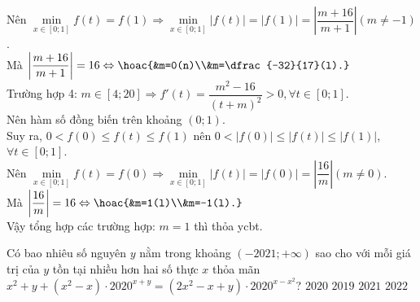\begin{ex}
{		Nên $\min\limits_{x\in[0;1]} f(t)=f(1)\Rightarrow\min\limits_{x\in[0;1]}\left|f(t)\right|=\left|f(1)\right|=\left|\dfrac{m+16}{m+1}\right|(m\neq-1)$.\\
		Mà $\left|\dfrac{m+16}{m+1}\right|=16\Leftrightarrow\hoac{&m=0(n)\\&m=\dfrac{-32}{17}(l).}$ \\
		Trường hợp 4: $m\in[4;20]\Rightarrow f'(t)=\dfrac{m^2-16}{(t+m)^2} >0,\forall t\in[0;1]$.\\
		Nên hàm số đồng biến trên khoảng $(0;1)$.\\
		Suy ra, $0<f(0)\leq f(t)\leq f(1)$ nên $0<\left|f(0)\right|\leq\left|f(t)\right|\leq\left|f(1)\right|$, $\forall t\in[0;1]$.\\
		Nên $\min\limits_{x\in[0;1]} f(t)=f(0)\Rightarrow\min\limits_{x\in[0;1]}\left|f(t)\right|=\left|f(0)\right|=\left|\dfrac{16}{m}\right|(m\neq 0)$.\\
		Mà $\left|\dfrac{16}{m}\right|=16\Leftrightarrow\hoac{&m=1(l)\\&m=-1(l).}$ \\
		Vậy tổng hợp các trường hợp: $m=1$ thì thỏa ycbt.
	}
\end{ex}
\begin{ex}
	Có bao nhiêu số nguyên $y$ nằm trong khoảng $(-2021;+\infty)$ sao cho với mỗi giá trị của $y$ tồn tại nhiều hơn hai số thực $x$ thỏa mãn $x^2+y+\left(x^2-x\right)\cdot 2020^{x+y}=\left(2x^2-x+y\right)\cdot 2020^{x-x^2}$?
	\choice
	{\True $2020$}
	{$2019$}
	{$2021$}
	{$2022$}
\end{ex}

